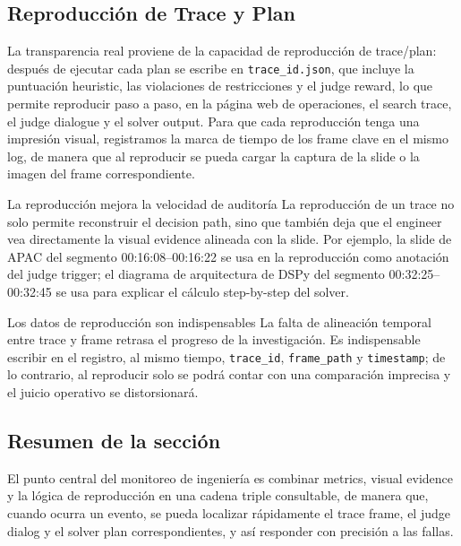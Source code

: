 \subsection{Reproducción de Trace y Plan}
La transparencia real proviene de la capacidad de reproducción de trace/plan: después de ejecutar cada plan se escribe en \texttt{trace\_id.json}, que incluye la puntuación heuristic, las violaciones de restricciones y el judge reward, lo que permite reproducir paso a paso, en la página web de operaciones, el search trace, el judge dialogue y el solver output. Para que cada reproducción tenga una impresión visual, registramos la marca de tiempo de los frame clave en el mismo log, de manera que al reproducir se pueda cargar la captura de la slide o la imagen del frame correspondiente.
\begin{knowledgebox}{La reproducción mejora la velocidad de auditoría}
La reproducción de un trace no solo permite reconstruir el decision path, sino que también deja que el engineer vea directamente la visual evidence alineada con la slide. Por ejemplo, la slide de APAC del segmento 00:16:08--00:16:22 se usa en la reproducción como anotación del judge trigger; el diagrama de arquitectura de DSPy del segmento 00:32:25--00:32:45 se usa para explicar el cálculo step-by-step del solver.
\end{knowledgebox}
\begin{warningbox}{Los datos de reproducción son indispensables}
La falta de alineación temporal entre trace y frame retrasa el progreso de la investigación. Es indispensable escribir en el registro, al mismo tiempo, \texttt{trace\_id}, \texttt{frame\_path} y \texttt{timestamp}; de lo contrario, al reproducir solo se podrá contar con una comparación imprecisa y el juicio operativo se distorsionará.
\end{warningbox}

\subsection{Resumen de la sección}
El punto central del monitoreo de ingeniería es combinar metrics, visual evidence y la lógica de reproducción en una cadena triple consultable, de manera que, cuando ocurra un evento, se pueda localizar rápidamente el trace frame, el judge dialog y el solver plan correspondientes, y así responder con precisión a las fallas.

